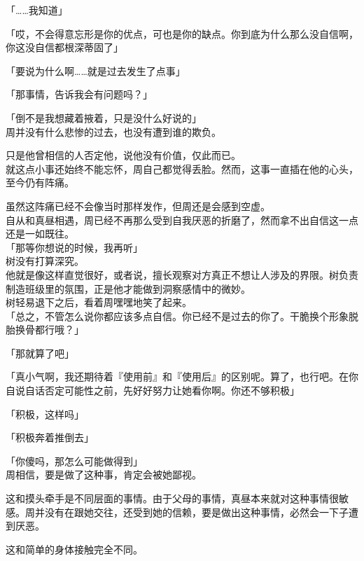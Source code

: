 「……我知道」

「哎，不会得意忘形是你的优点，可也是你的缺点。你到底为什么那么没自信啊，你这没自信都根深蒂固了」

「要说为什么啊……就是过去发生了点事」

「那事情，告诉我会有问题吗？」

「倒不是我想藏着掖着，只是没什么好说的」\\

周并没有什么悲惨的过去，也没有遭到谁的欺负。

只是他曾相信的人否定他，说他没有价值，仅此而已。\\

就这点小事还始终不能忘怀，周自己都觉得丢脸。然而，这事一直插在他的心头，至今仍有阵痛。

虽然这阵痛已经不会像当时那样发作，但周还是会感到空虚。\\

自从和真昼相遇，周已经不再那么受到自我厌恶的折磨了，然而拿不出自信这一点还是一如既往。\\

「那等你想说的时候，我再听」\\

树没有打算深究。\\

他就是像这样直觉很好，或者说，擅长观察对方真正不想让人涉及的界限。树负责制造班级里的氛围，正是他才能做到洞察感情中的微妙。\\

树轻易退下之后，看着周嘿嘿地笑了起来。\\

「总之，不管怎么说你都应该多点自信。你已经不是过去的你了。干脆换个形象脱胎换骨都行哦？」

「那就算了吧」

「真小气啊，我还期待着『使用前』和『使用后』的区别呢。算了，也行吧。在你自说自话否定可能性之前，先好好努力让她看你啊。你还不够积极」

「积极，这样吗」

「积极奔着推倒去」

「你傻吗，那怎么可能做得到」\\

周相信，要是做了这种事，肯定会被她鄙视。

这和摸头牵手是不同层面的事情。由于父母的事情，真昼本来就对这种事情很敏感。周并没有在跟她交往，还受到她的信赖，要是做出这种事情，必然会一下子遭到厌恶。

这和简单的身体接触完全不同。\\

